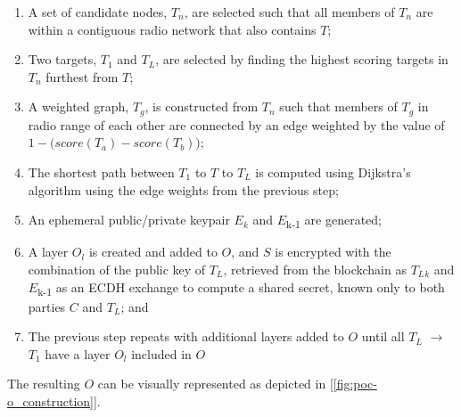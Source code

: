 \documentclass[10pt, nonatbib, nocopyrightspace, reprint]{sigplanconf}
\newcommand{\figref}[1]{[\autoref{#1}]}
\begin{document}
\begin{enumerate}
  \item A set of candidate nodes, $T_n$, are selected such that all members of $T_n$ are within a contiguous radio network that also contains $T$;
  \item Two targets, $T_1$ and $T_L$, are selected by finding the highest scoring targets in $T_n$ furthest from $T$;
  \item A weighted graph, $T_g$, is constructed from $T_n$ such that members of $T_g$ in radio range of each other are connected by an edge weighted by the value of \(1 - \Big({score(T_a) - score(T_b)}\Big)\);
  \item The shortest path between $T_1$ to $T$ to $T_L$ is computed using Dijkstra's algorithm\cite{dijkstra} using the edge weights from the previous step;
  \item An ephemeral public/private keypair $E_k$ and $E$\textsubscript{k-1} are generated;
  \item A layer $O_l$ is created and added to $O$, and $S$ is encrypted with the combination of the public key of $T_L$, retrieved from the blockchain as $T_L$$_k$ and $E$\textsubscript{k-1} as an ECDH exchange to compute a shared secret, known only to both parties $C$ and $T_L$; and
  \item The previous step repeats with additional layers added to $O$ until all $T_L$ $\rightarrow$ $T_1$ have a layer $O_l$ included in $O$
\end{enumerate}

The resulting $O$ can be visually represented as depicted in \figref{fig:poc-o_construction}.
\end{document}
